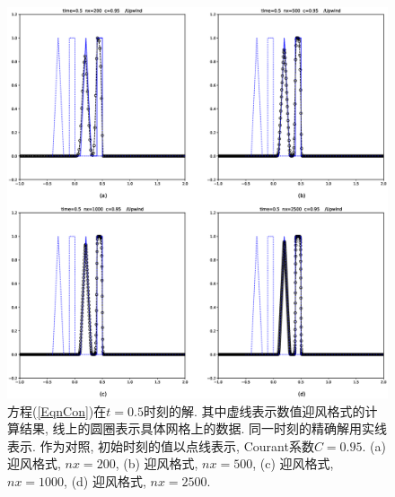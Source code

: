 \documentclass[10.5pt
]{article}
\begin{document}
\begin{figure}[htb]
	\centering
	\includegraphics[width=\textwidth]{hw2_1_nx.eps}
	\caption{方程(\ref{EqnCon})在$t=0.5$时刻的解. 其中虚线表示数值迎风格式的计算结果, 线上的圆圈表示具体网格上的数据. 同一时刻的精确解用实线表示. 作为对照, 初始时刻的值以点线表示, Courant系数$C = 0.95$. (a) 迎风格式, $nx = 200$, (b)  迎风格式, $nx = 500$, (c)  迎风格式, $nx = 1000$, (d) 迎风格式, $nx = 2500$.}  \label{fig12}
\end{figure}
\end{document}
